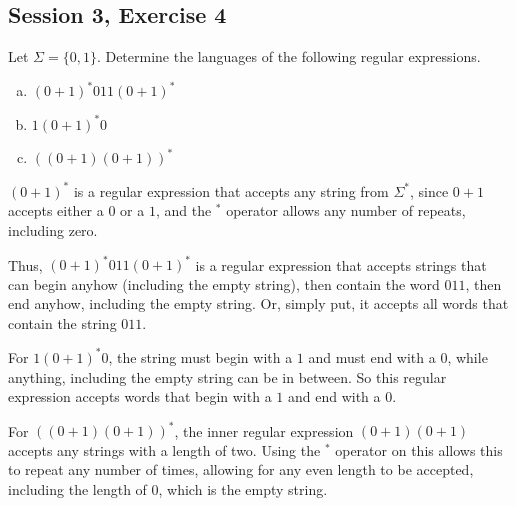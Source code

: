 \subsection{Session 3, Exercise 4}


Let $\Sigma=\{0,1\}$. Determine the languages of the following regular expressions.

\begin{enumerate}[a.)]
\item $(0+1)^*011(0+1)^*$
\item $1(0+1)^*0$
\item $((0+1)(0+1))^*$
\end{enumerate}


$(0+1)^*$ is a regular expression that accepts any string from $\Sigma^*$, since $0+1$ accepts either a $0$ or a $1$, and the $^*$ operator allows any number of repeats, including zero.

Thus, $(0+1)^*011(0+1)^*$ is a regular expression that accepts strings that can begin anyhow (including the empty string), then contain the word $011$, then end anyhow, including the empty string. Or, simply put, it accepts all words that contain the string $011$.

For $1(0+1)^*0$, the string must begin with a $1$ and must end with a $0$, while anything, including the empty string can be in between. So this regular expression accepts words that begin with a $1$ and end with a $0$.

For $((0+1)(0+1))^*$, the inner regular expression $(0+1)(0+1)$ accepts any strings with a length of two. Using the $^*$ operator on this allows this to repeat any number of times, allowing for any even length to be accepted, including the length of $0$, which is the empty string.